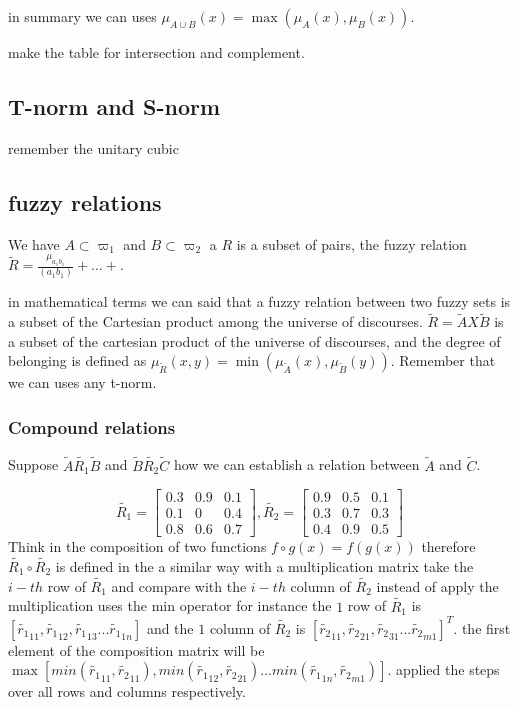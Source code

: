 \documentclass[10pt,a4paper]{article}
\begin{document}
in summary we can uses $ \mu_{A \cup B}(x) = \max ( \mu_{A}(x), \mu_{B}(x))$.

make the table for intersection and complement.


\subsection{T-norm and S-norm}
remember the unitary cubic




\subsection{fuzzy relations}

We have $A \subset \varpi_{1}$ and $ B \subset \varpi_{2}$ a $R$ is a subset of pairs, the fuzzy relation $\tilde{R} = \frac{\mu_{a_{1}b_{1}}}{(a_{1}b_{1})}+...+$.


in mathematical terms we can said that a fuzzy relation between two fuzzy sets is a subset of the Cartesian product among the universe of discourses. $\tilde{R}  = \tilde{A} X \tilde{B}$ is a subset of the cartesian product of the universe of discourses, and the degree of belonging is defined as $\mu_{\tilde{R}}(x,y) = \min ( \mu_{\tilde{A}}(x), \mu_{\tilde{B}}(y))$.  Remember that we can uses any t-norm.


\subsubsection{Compound relations}
Suppose $\tilde{A}\tilde{R_{1}}\tilde{B}$ and $\tilde{B}\tilde{R_{2}}\tilde{C}$ how we can establish a relation between $\tilde{A}$ and $\tilde{C}$.

\[
\tilde{R_{1}} = \begin{bmatrix}
0.3 & 0.9 & 0.1 \\
0.1 & 0 & 0.4 \\
0.8 & 0.6 & 0.7 
\end{bmatrix}, 
\tilde{R_{2}} = 
\begin{bmatrix}
0.9 & 0.5 & 0.1 \\
0.3 & 0.7 & 0.3\\
0.4 & 0.9 & 0.5
\end{bmatrix}
\]
Think in the composition of two functions $f \circ g(x) = f(g(x))$ therefore $\tilde{R_{1}}\circ \tilde{R_{2}}$ is defined in the a similar way with a multiplication matrix take the $i-th$ row of $\tilde{R_{1}}$ and compare with the $i-th$ column of $\tilde{R_{2}}$   instead of apply the multiplication uses the min operator for instance the $1$ row of $\tilde{R_{1}}$ is $[\tilde{r_{1}}_{11},\tilde{r_{1}}_{12}, \tilde{r_{1}}_{13} ... \tilde{r_{1}}_{1n}]$ and the $1$ column of $\tilde{R_{2}}$ is $[\tilde{r_{2}}_{11},\tilde{r_{2}}_{21}, \tilde{r_{2}}_{31} ... \tilde{r_{2}}_{m1}]^{T}$.
the first element of the composition matrix will be $ \max [ min(\tilde{r_{1}}_{11}, \tilde{r_{2}}_{11}) , min(\tilde{r_{1}}_{12},\tilde{r_{2}}_{21})...min( \tilde{r_{1}}_{1n},\tilde{r_{2}}_{m1}) ]$. applied the steps over all rows and columns respectively.
\end{document}
